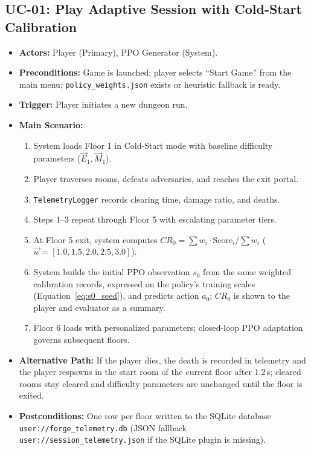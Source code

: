 \subsection{UC-01: Play Adaptive Session with Cold-Start Calibration}
\begin{itemize}
    \item \textbf{Actors:} Player (Primary), PPO Generator (System).
    \item \textbf{Preconditions:} Game is launched; player selects ``Start Game'' from the main menu; \texttt{policy\_weights.json} exists or heuristic fallback is ready.
    \item \textbf{Trigger:} Player initiates a new dungeon run.
    \item \textbf{Main Scenario:}
    \begin{enumerate}
        \item System loads Floor 1 in Cold-Start mode with baseline difficulty parameters ($\vec{E}_1, \vec{M}_1$).
        \item Player traverses rooms, defeats adversaries, and reaches the exit portal.
        \item \texttt{TelemetryLogger} records clearing time, damage ratio, and deaths.
        \item Steps 1--3 repeat through Floor 5 with escalating parameter tiers.
        \item At Floor 5 exit, system computes $CR_0 = \sum w_i \cdot \text{Score}_i / \sum w_i$ ($\vec{w} = [1.0, 1.5, 2.0, 2.5, 3.0]$).
        \item System builds the initial PPO observation $s_0$ from the same weighted calibration records, expressed on the policy's training scales (Equation~\ref{eq:s0_seed}), and predicts action $a_0$; $CR_0$ is shown to the player and evaluator as a summary.
        \item Floor 6 loads with personalized parameters; closed-loop PPO adaptation governs subsequent floors.
    \end{enumerate}
    \item \textbf{Alternative Path:} If the player dies, the death is recorded in telemetry and the player respawns in the start room of the current floor after 1.2\,s; cleared rooms stay cleared and difficulty parameters are unchanged until the floor is exited.
    \item \textbf{Postconditions:} One row per floor written to the SQLite database \texttt{user://forge\_telemetry.db} (JSON fallback \texttt{user://session\_telemetry.json} if the SQLite plugin is missing).
\end{itemize}


